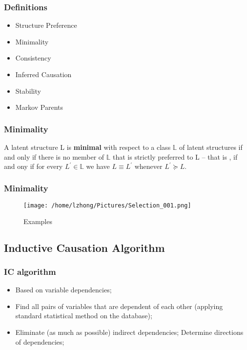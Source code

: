 \documentclass{beamer}
\begin{document}
\begin{frame}
\frametitle{Definitions}
\begin{itemize}
\item Structure Preference
\item Minimality
\item Consistency
\item Inferred Causation
\item Stability
\item Markov Parents
\end{itemize}
\end{frame}


\begin{frame}
\frametitle{Minimality}
A latent structure L is \textbf{minimal} with respect to a class $\mathbb{L}$
of latent structures if and only if there is no member of $\mathbb{L}$ that is
strictly preferred to L -- that is , if and ony if for every $L^{'} \in \mathbb{L}$
we have $L \equiv L^{'}$ whenever $L^{'} \succeq L$.
\end{frame}

\begin{frame}
\frametitle{Minimality}
\begin{figure}
\texttt{[image: /home/lzhong/Pictures/Selection\_001.png]}
\caption{Examples}
\end{figure}
\end{frame}


\subsection{Inductive Causation Algorithm}
\begin{frame}
\frametitle{IC algorithm}
\begin{itemize}
\item  Based on variable dependencies;
\item  Find all pairs of variables that are dependent of each other (applying standard statistical method on the database);
\item  Eliminate (as much as possible) indirect dependencies;
Determine directions of dependencies;
\end{itemize}
\end{frame}
\end{document}
